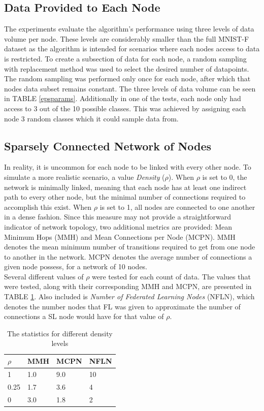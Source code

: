 \documentclass[letterpaper, 10 pt, conference]{ieeeconf}  %
\begin{document}
\subsection{Data Provided to Each Node}
The experiments evaluate the algorithm's performance using three levels of data volume per node. These levels are considerably smaller than the full MNIST-F dataset as the algorithm is intended for scenarios where each nodes access to data is restricted. To create a subsection of data for each node, a random sampling with replacement method was used to select the desired number of datapoints. The random sampling was performed only once for each node, after which that nodes data subset remains constant. The three levels of data volume can be seen in TABLE \ref{epsparams}. Additionally in one of the tests, each node only had access to 3 out of the 10 possible classes. This was achieved by assigning each node 3 random classes which it could sample data from.

\subsection{Sparsely Connected Network of Nodes}
In reality, it is uncommon for each node to be linked with every other node. To simulate a more realistic scenario, a value \emph{Density} ($\rho$). When $\rho$ is set to 0, the network is minimally linked, meaning that each node has at least one indirect path to every other node, but the minimal number of connections required to accomplish this exist. When $\rho$ is set to 1, all nodes are connected to one another in a dense fashion. Since this measure may not provide a straightforward indicator of network topology, two additional metrics are provided:  Mean Minimum Hops (MMH) and Mean Connections per Node (MCPN). MMH denotes the mean minimum number of transitions required to get from one node to another in the network. MCPN denotes the average number of connections a given node possess, for a network of 10 nodes. \\

Several different values of $\rho$ were tested for each count of data. The values that were tested, along with their corresponding MMH and MCPN, are presented in TABLE \ref{sparsedensities}. Also included is \emph{Number of Federated Learning Nodes} (NFLN), which denotes the number nodes that FL was given to approximate the number of connections a SL node would have for that value of $\rho$.

\begin{table}[H]
	\centering
	\begin{tabular}{l|l|l|l}
		$\rho$ & MMH & MCPN & NFLN \\ \hline
		1 & 1.0 & 9.0 &  10\\
		0.25    & 1.7 & 3.6 & 4 \\
		0    & 3.0 & 1.8  & 2 \\
	\end{tabular}
	\caption{The statistics for different density levels} \label{sparsedensities}
\end{table}
\end{document}
